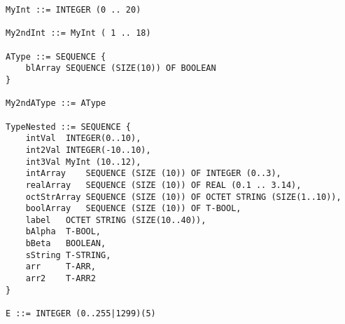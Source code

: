 
\begin{minipage}{15cm}
\begin{lstlisting}[style=CStyle, caption=Excerpt of the tested ASN1 grammar., label=asn_excerpt, mathescape=true]
MyInt ::= INTEGER (0 .. 20)

My2ndInt ::= MyInt ( 1 .. 18)

AType ::= SEQUENCE {
    blArray SEQUENCE (SIZE(10)) OF BOOLEAN
}

My2ndAType ::= AType

TypeNested ::= SEQUENCE {
    intVal  INTEGER(0..10),
    int2Val INTEGER(-10..10),
    int3Val MyInt (10..12),
    intArray    SEQUENCE (SIZE (10)) OF INTEGER (0..3),
    realArray   SEQUENCE (SIZE (10)) OF REAL (0.1 .. 3.14),
    octStrArray SEQUENCE (SIZE (10)) OF OCTET STRING (SIZE(1..10)),
    boolArray   SEQUENCE (SIZE (10)) OF T-BOOL,
    label   OCTET STRING (SIZE(10..40)),
    bAlpha  T-BOOL,
    bBeta   BOOLEAN,
    sString T-STRING,
    arr     T-ARR,
    arr2    T-ARR2
}

E ::= INTEGER (0..255|1299)(5)
\end{lstlisting}
\end{minipage}


